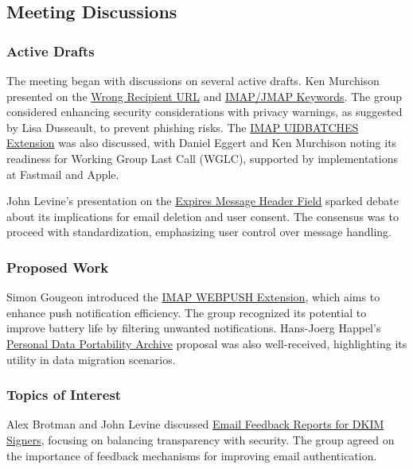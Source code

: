 \documentclass{article}
\begin{document}
\subsection{Meeting Discussions}

\subsubsection{Active Drafts}
The meeting began with discussions on several active drafts. Ken Murchison presented on the \href{https://datatracker.ietf.org/doc/html/draft-ietf-mailmaint-wrong-recipient}{Wrong Recipient URL} and \href{https://datatracker.ietf.org/doc/html/draft-ietf-mailmaint-messageflag-mailboxattribute}{IMAP/JMAP Keywords}. The group considered enhancing security considerations with privacy warnings, as suggested by Lisa Dusseault, to prevent phishing risks. The \href{https://datatracker.ietf.org/doc/html/draft-ietf-mailmaint-imap-uidbatches}{IMAP UIDBATCHES Extension} was also discussed, with Daniel Eggert and Ken Murchison noting its readiness for Working Group Last Call (WGLC), supported by implementations at Fastmail and Apple.

John Levine's presentation on the \href{https://datatracker.ietf.org/doc/html/draft-ietf-mailmaint-expires}{Expires Message Header Field} sparked debate about its implications for email deletion and user consent. The consensus was to proceed with standardization, emphasizing user control over message handling.

\subsubsection{Proposed Work}
Simon Gougeon introduced the \href{https://datatracker.ietf.org/doc/html/draft-gougeon-imap-webpush}{IMAP WEBPUSH Extension}, which aims to enhance push notification efficiency. The group recognized its potential to improve battery life by filtering unwanted notifications. Hans-Joerg Happel's \href{https://datatracker.ietf.org/doc/html/draft-happel-mailmaint-pdparchive}{Personal Data Portability Archive} proposal was also well-received, highlighting its utility in data migration scenarios.

\subsubsection{Topics of Interest}
Alex Brotman and John Levine discussed \href{https://datatracker.ietf.org/doc/html/draft-brotman-dkim-fbl}{Email Feedback Reports for DKIM Signers}, focusing on balancing transparency with security. The group agreed on the importance of feedback mechanisms for improving email authentication.
\end{document}
